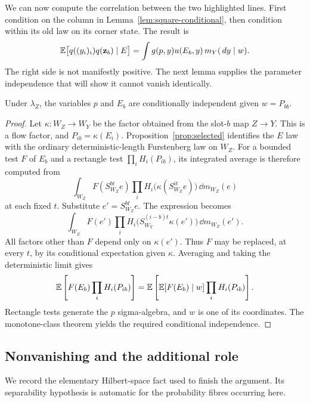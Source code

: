 We can now compute the correlation between the two highlighted lines.
First condition on the column in Lemma~\ref{lem:square-conditional},
then condition within its old law on its corner state. The result is
\begin{equation}\label{eq:square-product}
 \mathbb E\bigl[q((y_i)_i)q(\mathbf z_b)\mid E\bigr]
   =\int g(p,y)u(E_b,y)\,m_Y(\,d y\mid w).
\end{equation}
The right side is not manifestly positive. The next lemma supplies the
parameter independence that will show it cannot vanish identically.

\begin{lemma}\label{lem:parameter-reanchoring}
Under $\lambda_Z$, the variables $p$ and $E_b$ are conditionally independent
given $w=P_{bb}$.
\end{lemma}

\begin{proof}
Let $\kappa:W_Z\to W_Y$ be the factor obtained from the slot-$b$
map $Z\to Y$. This is a flow factor, and
$P_{ib}=\kappa(E_i)$. Proposition~\ref{prop:selected} identifies the
$E$ law with the ordinary deterministic-length Furstenberg law on
$W_Z$. For a bounded test $F$ of $E_b$ and a rectangle test
$\prod_i H_i(P_{ib})$, its integrated average is therefore computed
from
\[
 \int_{W_Z} F(S_{W_Z}^{bt}e)
       \prod_i H_i\bigl(\kappa(S_{W_Z}^{it}e)\bigr)\,
                         \dd m_{W_Z}(e)
\]
at each fixed $t$. Substitute $e'=S_{W_Z}^{bt}e$. The expression becomes
\[
 \int_{W_Z} F(e')
       \prod_i H_i\bigl(S_{W_Y}^{(i-b)t}\kappa(e')\bigr)\,
                         \dd m_{W_Z}(e').
\]
All factors other than $F$ depend only on $\kappa(e')$. Thus $F$ may
be replaced, at every $t$, by its conditional expectation given
$\kappa$. Averaging and taking the deterministic limit gives
\[
 \mathbb E\left[F(E_b)\prod_i H_i(P_{ib})\right]
 =\mathbb E\left[\mathbb E[F(E_b)\mid w]\prod_i H_i(P_{ib})\right].
\]
Rectangle tests generate the $p$ sigma-algebra, and $w$ is one of
its coordinates. The monotone-class theorem yields the required
conditional independence.
\end{proof}

\subsection{Nonvanishing and the additional role}

We record the elementary Hilbert-space fact used to finish the
argument. Its separability hypothesis is automatic for the probability
fibres occurring here.

